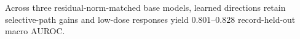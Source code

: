 Across three residual-norm-matched base models, learned directions retain
selective-path gains and low-dose responses yield $0.801$--$0.828$
record-held-out macro AUROC.
